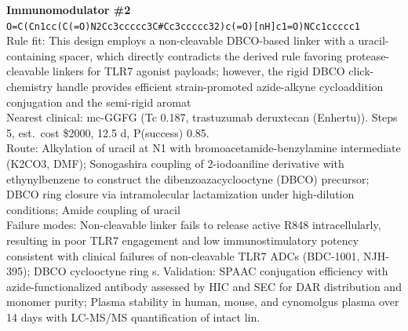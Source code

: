\documentclass[10pt]{article}
\begin{document}
\noindent\textbf{Immunomodulator \#2} \\ \texttt{O=C(Cn1cc(C(=O)N2Cc3ccccc3C\#Cc3ccccc32)c(=O)[nH]c1=O)NCc1ccccc1} \\ Rule fit: This design employs a non-cleavable DBCO-based linker with a uracil-containing spacer, which directly contradicts the derived rule favoring protease-cleavable linkers for TLR7 agonist payloads; however, the rigid DBCO click-chemistry handle provides efficient strain-promoted azide-alkyne cycloaddition conjugation and the semi-rigid aromat \\ Nearest clinical: mc-GGFG (Tc 0.187, trastuzumab deruxtecan (Enhertu)). Steps 5, est.\ cost \$2000, 12.5 d, P(success) 0.85. \\ Route: Alkylation of uracil at N1 with bromoacetamide-benzylamine intermediate (K2CO3, DMF); Sonogashira coupling of 2-iodoaniline derivative with ethynylbenzene to construct the dibenzoazacyclooctyne (DBCO) precursor; DBCO ring closure via intramolecular lactamization under high-dilution conditions; Amide coupling of uracil  \\ Failure modes: Non-cleavable linker fails to release active R848 intracellularly, resulting in poor TLR7 engagement and low immunostimulatory potency consistent with clinical failures of non-cleavable TLR7 ADCs (BDC-1001, NJH-395); DBCO cyclooctyne ring s. Validation: SPAAC conjugation efficiency with azide-functionalized antibody assessed by HIC and SEC for DAR distribution and monomer purity; Plasma stability in human, mouse, and cynomolgus plasma over 14 days with LC-MS/MS quantification of intact lin. \\[0.4em]
\end{document}
